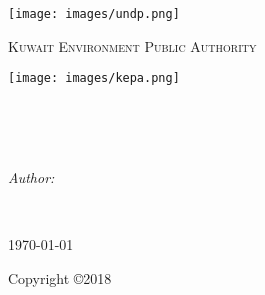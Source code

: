 \documentclass[
12pt, %
oneside, %
english, %
singlespacing, %
nolistspacing, %
liststotoc, %
parskip, %
headsepline, %
chapterinoneline, %
]{MastersDoctoralThesis} %
\author{Brian Freeman, PE} %
\begin{document}
\frontmatter %

\pagestyle{plain} %


\begin{titlepage}
\begin{center}

\vspace*{.02\textheight}
{\scshape\LARGE \univname\par} %
\begin{center}
\texttt{[image: images/undp.png]} %
\end{center}
\textsc{\LARGE Kuwait Environment Public Authority}\\[0.5cm] 
\begin{center}
\texttt{[image: images/kepa.png]} %
\end{center}
\HRule \\[0.4cm] %
{\huge \bfseries \ttitle\par}\vspace{0.4cm} %
\HRule \\[1.5cm] %
 
\begin{minipage}[t]{0.4\textwidth}
\begin{flushleft} \large
\emph{Author:}\\
{\authorname} %
\end{flushleft}
\end{minipage}
\begin{minipage}[t]{0.4\textwidth}
\begin{flushright} \large

\end{flushright}
\end{minipage}\\[1cm]
 
\vfill

 
\vfill
{\large \today}\\[2cm] %
\vfill
\end{center}
Copyright \copyright 2018
\end{titlepage}
\end{document}
